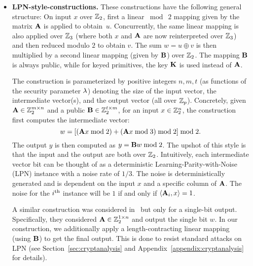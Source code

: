 \begin{itemize}
    \item \textbf{LPN-style-constructions.}
    These constructions have the following general structure: On input $x$ over $\mathbb{Z}_2$, first a linear $\bmod~2$ mapping given by the matrix $\mat{A}$ is applied to obtain~$u$. Concurrently, the same linear mapping is also applied over $\mathbb{Z}_3$ (where both $x$ and $\mat{A}$ are now reinterpreted over $\mathbb{Z}_3$) and then reduced modulo $2$ to obtain $v$. The sum $w = u \oplus v$ is then multiplied by a second linear mapping (given by $\mat{B}$) over $\mathbb{Z}_2$. The mapping $\mat{B}$ is always public, while for keyed primitives, the key $\mat{K}$ is used instead of $\mat{A}$.

    \hspace*{1em} The construction is parameterized by positive integers $n,m,t$ (as functions of the security parameter $\lambda$) denoting the size of the input vector, the intermediate vector(s), and the output vector (all over $\mathbb{Z}_p$).
    Concretely, given $\mat{A} \in \Z_2^{m \times n}$ and a public $\mat{B} \in \Z_2^{t \times m}$, for an input $x \in \mathbb{Z}_2^n$, the construction first computes the intermediate vector:
   \[
        w = \left[(\mat{A}x \bmod 2) + (\mat{A}x \bmod 3) \bmod 2\right] \bmod 2.
    \]
    The output $y$ is then computed as $y = \mat{B}w \bmod 2$. The upshot of this style is that the input and the output are both over $\mathbb{Z}_2$. Intuitively, each intermediate vector bit can be thought of as a deterministic Learning-Parity-with-Noise (LPN) instance with a noise rate of $1/3$. The noise is deterministically generated and is dependent on the input $x$ and a specific column of $\mat{A}$. The noise for the $i^{\textnormal{th}}$ instance will be $1$ if and only if $\left<\mat{A}_i, x\right> = 1$.

    \hspace*{1em} A similar construction was considered in~\cite{boneh2018-darkmatter} but only for a single-bit output. Specifically, they considered $\mat{A} \in \Z_2^{1 \times n}$ and output the single bit $w$. In our construction, we additionally apply a length-contracting linear mapping (using $\mat{B}$) to get the final output. This is done to resist standard attacks on LPN (see Section~\ref{sec:cryptanalysis} and Appendix~\ref{appendix:cryptanalysis} for details).
\end{itemize}



